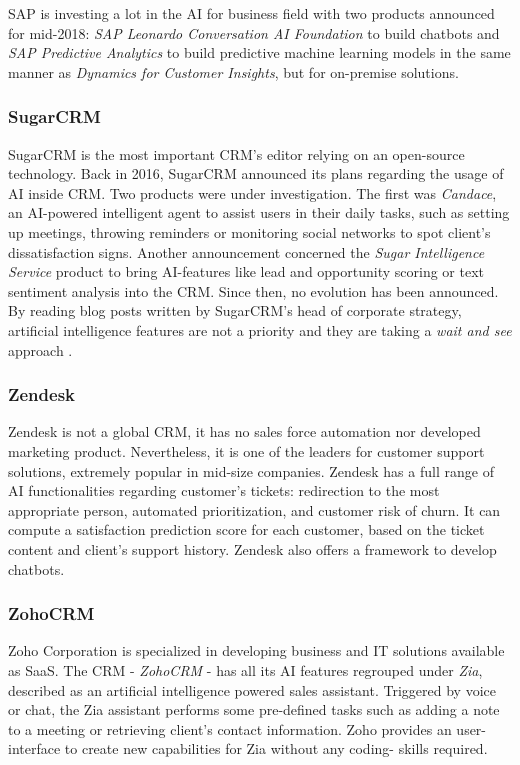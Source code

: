SAP is investing a lot in the AI for business field with two products announced for mid-2018: \textit{SAP Leonardo Conversation AI Foundation} to build chatbots and \textit{SAP Predictive Analytics} to build predictive machine learning models in the same manner as \textit{Dynamics for Customer Insights}, but for on-premise solutions.


\subsubsection*{SugarCRM}
SugarCRM is the most important CRM's editor relying on an open-source technology. Back in 2016, SugarCRM announced its plans regarding the usage of AI inside CRM. Two products were under investigation. The first was \textit{Candace}, an AI-powered intelligent agent to assist users in their daily tasks, such as setting up meetings, throwing reminders or monitoring social networks to spot client's dissatisfaction signs. Another announcement concerned the \textit{Sugar Intelligence Service} product to bring AI-features like lead and opportunity scoring or text sentiment analysis into the CRM. Since then, no evolution has been announced. By reading blog posts written by SugarCRM's head of corporate strategy, artificial intelligence features are not a priority and they are taking a \textit{wait and see} approach \cite{sugarcrm1,sugarcrm2}.

\subsubsection*{Zendesk}
Zendesk is not a global CRM, it has no sales force automation nor developed marketing product. Nevertheless, it is one of the leaders for customer support solutions, extremely popular in mid-size companies. Zendesk has a full range of AI functionalities regarding customer's tickets: redirection to the most appropriate person, automated prioritization, and customer risk of churn. It can compute a satisfaction prediction score for each customer, based on the ticket content and client's support history. Zendesk also offers a framework to develop chatbots.

\subsubsection*{ZohoCRM}
Zoho Corporation is specialized in developing business and IT solutions available as SaaS. The CRM - \textit{ZohoCRM} - has all its AI features regrouped under \textit{Zia}, described as an artificial intelligence powered sales assistant. Triggered by voice or chat, the Zia assistant performs some pre-defined tasks such as adding a note to a meeting or retrieving client's contact information. Zoho provides an user-interface to create new capabilities for Zia without any coding- skills required.

